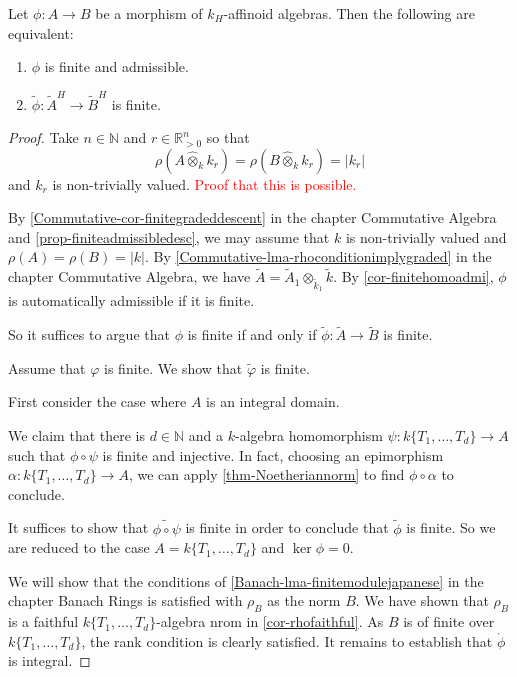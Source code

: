\begin{proposition}
    Let $\phi:A\rightarrow B$ be a morphism of $k_H$-affinoid algebras. Then the following are equivalent:
    \begin{enumerate}
        \item $\phi$ is finite and admissible.
        \item $\tilde{\phi}:\tilde{A}^H\rightarrow \tilde{B}^H$ is finite.
    \end{enumerate}
\end{proposition}
\begin{proof}
    Take $n\in \mathbb{N}$ and $r\in \mathbb{R}^n_{>0}$ so that 
    \[
        \rho(A\hat{\otimes}_k k_r)=\rho(B\hat{\otimes}_k k_r)=|k_r|
    \]
    and $k_r$ is non-trivially valued. \textcolor{red}{Proof that this is possible.}

    By \cref{Commutative-cor-finitegradeddescent} in the chapter Commutative Algebra and \cref{prop-finiteadmissibledesc},  we may assume that $k$ is non-trivially valued and $\rho(A)=\rho(B)=|k|$. By \cref{Commutative-lma-rhoconditionimplygraded} in  the chapter Commutative Algebra, we have $\tilde{A}=\tilde{A}_1\otimes_{\tilde{k}_1} \tilde{k}$. 
    By \cref{cor-finitehomoadmi}, $\phi$ is automatically admissible if it is finite. 
    
    So it suffices to argue that $\phi$ is finite if and only if $\tilde{\phi}:\tilde{A}\rightarrow \tilde{B}$ is finite. 
    
    Assume that $\varphi$ is finite. We show that $\tilde{\varphi}$ is finite. 

    First consider the case where $A$ is an integral domain. 
    
    We claim that there is $d\in \mathbb{N}$ and a $k$-algebra homomorphism $\psi:k\{T_1,\ldots,T_d\}\rightarrow A$ such that $\phi\circ \psi$ is finite and injective.  In fact, choosing an epimorphism $\alpha:k\{T_1,\ldots,T_d\}\rightarrow A$, we can apply \cref{thm-Noetheriannorm} to find $\phi\circ \alpha$ to conclude.

    It suffices to show that $\widetilde{\phi\circ\psi}$ is finite in order to conclude that $\tilde{\phi}$ is finite. So we are reduced to the case $A=k\{T_1,\ldots,T_d\}$ and $\ker \phi=0$.

    We will show that the conditions of \cref{Banach-lma-finitemodulejapanese} in the chapter Banach Rings is satisfied with $\rho_B$ as the norm $B$. We have shown that $\rho_B$ is a faithful $k\{T_1,\ldots,T_d\}$-algebra nrom in \cref{cor-rhofaithful}. As $B$ is of finite over $k\{T_1,\ldots,T_d\}$, the rank condition is clearly satisfied. It remains to establish that $\mathring{\phi}$ is integral.


\end{proof}
